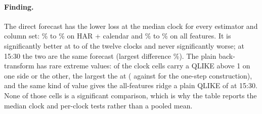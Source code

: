 \paragraph{Finding.} The direct forecast has the lower loss at the median
clock for every estimator and column set: \runappRdBaseLo{}\% to
\runappRdBaseHi{}\% on HAR + calendar and \runappRdAllLo{}\% to
\runappRdAllHi{}\% on all features. It is significantly better at
\runappRdBetterLo{} to \runappRdBetterHi{} of the twelve clocks and never
significantly worse; at 15:30 the two are the same forecast (largest
difference \runappRdLastMax{}\%). The plain
back-transform has rare extreme values: \runappRdExtremeN{} of the
\runappRdCells{} clock cells carry a QLIKE above 1 on one side or the other,
the largest the \runappRdExtremeCell{} at \runappRdExtremeClock{}
(\runappRdExtremeQ{} against \runappRdExtremeOne{} for the one-step
construction), and the same kind of value gives the all-features ridge a plain
QLIKE of \runappRdAllRidgeLast{} at 15:30. None of those cells is a significant
comparison, which is why the table reports the median clock and per-clock tests
rather than a pooled mean.

